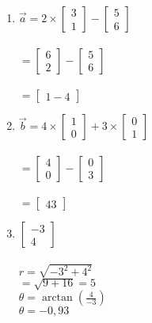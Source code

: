 \documentclass[a4paper]{article}
\begin{document}
    \begin{enumerate}[1.]
        \item $\overrightarrow{a} = 2 \times \begin{bmatrix}3 \\ 1 \end{bmatrix} - \begin{bmatrix}5 \\ 6\end{bmatrix}$\\\\
        $=  \begin{bmatrix}6 \\ 2\end{bmatrix} - \begin{bmatrix}5 \\ 6\end{bmatrix}$\\\\
        $= \begin{bmatrix}1 -4\end{bmatrix}$

        \item $\overrightarrow{b} = 4 \times \begin{bmatrix}1 \\ 0 \end{bmatrix} + 3 \times \begin{bmatrix}0 \\ 1\end{bmatrix}$\\\\
        $=  \begin{bmatrix}4 \\ 0\end{bmatrix} - \begin{bmatrix}0 \\ 3\end{bmatrix}$\\\\
        $= \begin{bmatrix}4 3\end{bmatrix}$

        \item $\begin{bmatrix}-3 \\ 4\end{bmatrix}$\\\\
        $r = \sqrt{-3^2 + 4^2}$\\
        $= \sqrt{9 + 16}= 5$\\
        $\theta = \arctan (\frac{4}{-3})$\\
        $\theta=-0,93$


\end{enumerate}
\end{document}
